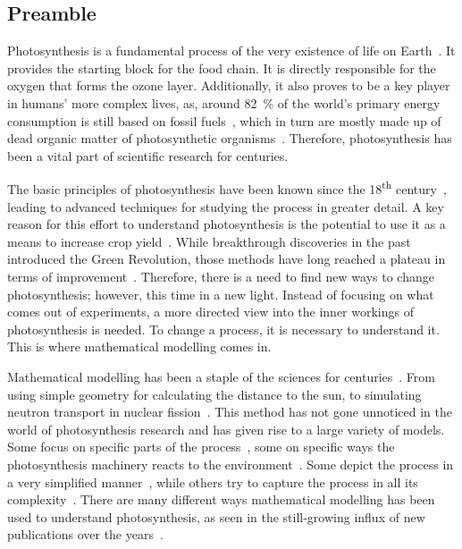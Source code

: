 \subsection{Preamble}

Photosynthesis is a fundamental process of the very existence of life on Earth~\cite{stirbetPhotosynthesisBasicsHistory2020, janssenPhotosynthesisForefrontSustainable2014,johnsonPhotosynthesis2016}. It provides the starting block for the food chain. It is directly responsible for the oxygen that forms the ozone layer. Additionally, it also proves to be a key player in humans' more complex lives, as, around \qty{82}{\percent} of the world's primary energy consumption is still based on fossil fuels~\cite{FossilFuelShare}, which in turn are mostly made up of dead organic matter of photosynthetic organisms~\cite{pisupadtiFuelChemistry2003}. Therefore, photosynthesis has been a vital part of scientific research for centuries.

The basic principles of photosynthesis have been known since the 18\textsuperscript{th} century~\cite{ingenhouszExperimentsVegetablesDiscovering1779}, leading to advanced techniques for studying the process in greater detail. A key reason for this effort to understand photosynthesis is the potential to use it as a means to increase crop yield~\cite{murchieAgricultureNewChallenges2009}. While breakthrough discoveries in the past introduced the Green Revolution, those methods have long reached a plateau in terms of improvement~\cite{longCanImprovementPhotosynthesis2006}. Therefore, there is a need to find new ways to change photosynthesis; however, this time in a new light. Instead of focusing on what comes out of experiments, a more directed view into the inner workings of photosynthesis is needed. To change a process, it is necessary to understand it. This is where mathematical modelling comes in.

Mathematical modelling has been a staple of the sciences for centuries~\cite{banerjeeMathematicalModelingModels2021}. From using simple geometry for calculating the distance to the sun, to simulating neutron transport in nuclear fission~\cite{demaziereModellingNuclearReactor2020}. This method has not gone unnoticed in the world of photosynthesis research and has given rise to a large variety of models. Some focus on specific parts of the process~\cite{liImpactIonFluxes2021,matuszynskaMathematicalModelNonphotochemical2016}, some on specific ways the photosynthesis machinery reacts to the environment~\cite{fuenteMathematicalModelSimulate2024}. Some depict the process in a very simplified manner~\cite{farquharBiochemicalModelPhotosynthetic1980,voncaemmererSteadystateModelsPhotosynthesis2013,lochockiWidelyUsedVariants2025a}, while others try to capture the process in all its complexity~\cite{zhuEphotosynthesisComprehensiveDynamic2013}. There are many different ways mathematical modelling has been used to understand photosynthesis, as seen in the still-growing influx of new publications over the years~.


